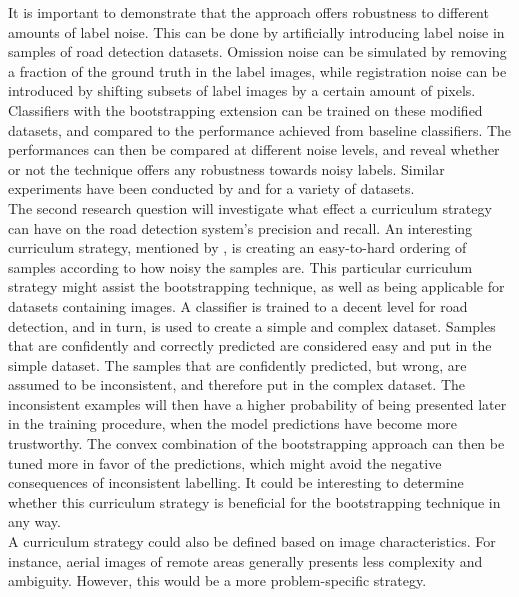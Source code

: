 It is important to demonstrate that the approach offers robustness to different amounts of label noise. This can be done by artificially introducing label noise in samples of road detection datasets. Omission noise can be simulated by removing a fraction of the ground truth in the label images, while registration noise can be introduced by shifting subsets of label images by a certain amount of pixels. Classifiers with the bootstrapping extension can be trained on these modified datasets, and compared to the performance achieved from baseline classifiers. The performances can then be compared at different noise levels, and reveal whether or not the technique offers any robustness towards noisy labels. Similar experiments have been conducted by \citep{Sukhbaatar_noisy_network_learning} and \citep{Reed_noisy_labels_bootstrapping} for a variety of datasets. \\

The second research question will investigate what effect a curriculum strategy can have on the road detection system's precision and recall. An interesting curriculum strategy, mentioned by \cite{Bengio_curriculumlearning}, is creating an easy-to-hard ordering of samples according to how noisy the samples are. This particular curriculum strategy might assist the bootstrapping technique, as well as being applicable for datasets containing images. A classifier is trained to a decent level for road detection, and in turn, is used to create a simple and complex dataset. Samples that are confidently and correctly predicted are considered easy and put in the simple dataset. The samples that are confidently predicted, but wrong, are assumed to be inconsistent, and therefore put in the complex dataset. The inconsistent examples will then have a higher probability of being presented later in the training procedure, when the model predictions have become more trustworthy. The convex combination of the bootstrapping approach can then be tuned more in favor of the predictions, which might avoid the negative consequences of inconsistent labelling.  It could be interesting to determine whether this curriculum strategy is beneficial for the bootstrapping technique in any way.\\

A curriculum strategy could also be defined based on image characteristics. For instance, aerial images of remote areas generally presents less complexity and ambiguity. However, this would be a more problem-specific strategy. \\ 

